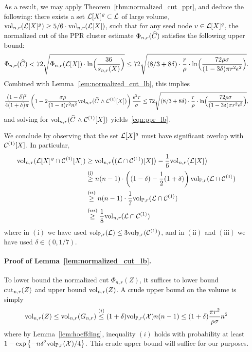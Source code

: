 	As a result, we may apply Theorem~\ref{thm:normalized_cut_ppr}, and deduce the following: there exists a set $\mathcal{L}[X]^g \subset \mathcal{L}$ of large volume, $\mathrm{vol}_{n,r}(\mathcal{L}[X]^g) \geq 5/6 \cdot \mathrm{vol}_{n,r}(\mathcal{L}[X])$, such that for any seed node $v \in \mathcal{L}[X]^g$, the normalized cut of the PPR cluster estimate $\Phi_{n,r}(\widehat{C})$ satisfies the following upper bound:
	\begin{equation*}
	\Phi_{n,r}(\widehat{C}) < 72\sqrt{\Phi_{n,r}(\mathcal{L}[X]) \cdot \ln\Bigl(\frac{36}{s_{n,r}(X)}\Bigr)} \leq  72\sqrt{(8/3 + 8\delta) \cdot \frac{r}{\rho} \cdot \ln\Bigl(\frac{72 \rho \sigma}{(1 - 3\delta)\pi r^2 \epsilon^2}\Bigr)}.
	\end{equation*}	
	Combined with Lemma~\ref{lem:normalized_cut_lb}, this implies
	\begin{equation}
	\label{pf:ppr_lb_3}
	\frac{(1 - \delta)^2}{4(1 + \delta)\pi} \left(1 - 2 \frac{\sigma \rho}{(1 - \delta) r^2 n^2} \mathrm{vol}_{n,r}(\widehat{C} \vartriangle \mathcal{C}^{(1)}[X]) \right) \frac{\epsilon^2 r}{\sigma} \leq 72\sqrt{(8/3 + 8\delta) \cdot \frac{r}{\rho} \cdot \ln\Bigl(\frac{72 \rho \sigma}{(1 - 3\delta)\pi r^2 \epsilon^2}\Bigr)},
	\end{equation}
	and solving for $\mathrm{vol}_{n,r}(\widehat{C} \vartriangle \mathcal{C}^{(1)}[X])$ yields~\eqref{eqn:ppr_lb}. 
	
	We conclude by observing that the set $\mathcal{L}[X]^g$ must have significant overlap with $\mathcal{C}^{(1)}[X]$. In particular,
	\begin{align*}
	\mathrm{vol}_{n,r}(\mathcal{L}[X]^g \cap \mathcal{C}^{(1)}[X]) & \geq \mathrm{vol}_{n,r}\bigl((\mathcal{L} \cap \mathcal{C}^{(1)})[X]\bigr) - \frac{1}{6}\mathrm{vol}_{n,r}\bigl(\mathcal{L}[X]\bigr) \\
	& \overset{\mathrm{(i)}}{\geq} n(n-1) \cdot \left((1 - \delta) - \frac{1}{2}(1 + \delta)\right)\mathrm{vol}_{\mathbb{P},r}( \mathcal{L} \cap \mathcal{C}^{(1)}) \\
	& \overset{\mathrm(ii)}{\geq} n(n - 1) \cdot \frac{1}{7} \mathrm{vol}_{\mathbb{P},r}( \mathcal{L} \cap \mathcal{C}^{(1)}) \\
	& \overset{\mathrm(iii)}{\geq} \frac{1}{8} \mathrm{vol}_{n,r}( \mathcal{L} \cap \mathcal{C}^{(1)})
	\end{align*}
	where in $\mathrm{(i)}$ we have used $\mathrm{vol}_{\mathbb{P},r}(\mathcal{L}) \leq 3 \mathrm{vol}_{\mathbb{P},r}(\mathcal{C}^{(1)})$, and in $\mathrm{(ii)}$ and $\mathrm{(iii)}$ we have used $\delta \in (0,1/7)$.

\paragraph{Proof of Lemma~\ref{lem:normalized_cut_lb}.}
	To lower bound the normalized cut $\Phi_{n,r}(Z)$, it suffices to lower bound $\mathrm{cut}_{n,r}(Z)$ and upper bound $\mathrm{vol}_{n,r}(Z)$. A crude upper bound on the volume is simply 
	\begin{equation}
	\label{eqn:normalized_cut_lb_pf4}
	\mathrm{vol}_{n,r}(Z) \leq \mathrm{vol}_{n,r}(G_{n,r}) \overset{(i)}{\leq} (1 + \delta)  \mathrm{vol}_{\mathbb{P},r}(\mathcal{X}) n (n - 1) \leq (1 + \delta)\frac{\pi r^2}{\rho \sigma} n^2
	\end{equation}
	where by Lemma~\ref{lem:hoeffding}, inequality $(i)$ holds with probability at least $1 - \exp\left\{-n\delta^2 \mathrm{vol}_{\mathbb{P},r}(\mathcal{X})/4\right\}$. This crude upper bound will suffice for our purposes.
	
